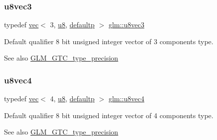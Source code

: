 \subsubsection{\texorpdfstring{u8vec3}{u8vec3}}
{\footnotesize\ttfamily typedef \mbox{\hyperlink{structglm_1_1vec}{vec}}$<$ 3, \mbox{\hyperlink{group__gtc__type__precision_ga5e3dc67373d5068997d2d9f41c9024d2}{u8}}, \mbox{\hyperlink{namespaceglm_a36ed105b07c7746804d7fdc7cc90ff25a9d21ccd8b5a009ec7eb7677befc3bf51}{defaultp}} $>$ \mbox{\hyperlink{group__gtc__type__precision_gaa86b325e581afdc643495fbe428c1f1b}{glm\+::u8vec3}}}

Default qualifier 8 bit unsigned integer vector of 3 components type. \begin{DoxySeeAlso}{See also}
\mbox{\hyperlink{group__gtc__type__precision}{G\+L\+M\+\_\+\+G\+T\+C\+\_\+type\+\_\+precision}} 
\end{DoxySeeAlso}
\mbox{\label{group__gtc__type__precision_ga6c8841fa492bd5b1078b171452fd6974}} 
\subsubsection{\texorpdfstring{u8vec4}{u8vec4}}
{\footnotesize\ttfamily typedef \mbox{\hyperlink{structglm_1_1vec}{vec}}$<$ 4, \mbox{\hyperlink{group__gtc__type__precision_ga5e3dc67373d5068997d2d9f41c9024d2}{u8}}, \mbox{\hyperlink{namespaceglm_a36ed105b07c7746804d7fdc7cc90ff25a9d21ccd8b5a009ec7eb7677befc3bf51}{defaultp}} $>$ \mbox{\hyperlink{group__gtc__type__precision_ga6c8841fa492bd5b1078b171452fd6974}{glm\+::u8vec4}}}

Default qualifier 8 bit unsigned integer vector of 4 components type. \begin{DoxySeeAlso}{See also}
\mbox{\hyperlink{group__gtc__type__precision}{G\+L\+M\+\_\+\+G\+T\+C\+\_\+type\+\_\+precision}} 
\end{DoxySeeAlso}
\mbox{\label{group__gtc__type__precision_gad8c2939e1fdd8e5828b31d95c52255d5}} 
